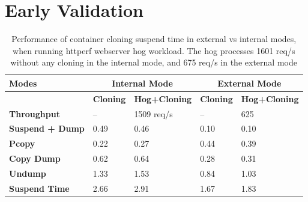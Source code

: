 \section{Early Validation}
\label{sec:evaluation}




\begin{table}[ht]
  \centering
    \begin{tabular}{ | p{1.8cm} | l | l | l | l |}
    \hline
    \textbf{Modes} & \multicolumn{2}{|c|}{\textbf{Internal Mode}} & \multicolumn{2}{|c|}{\textbf{External Mode}}\\\hline
    \textbf{ } & \textbf{Cloning} & \textbf{Hog+Cloning} & \textbf{Cloning} & \textbf{Hog+Cloning} \\ \hline
    \hline
    \textbf{Throughput} & --  & 1509 req/s & --  & 625\\ \hline
    \hline
    \textbf{Suspend + Dump} & 0.49 & 0.46 & 0.10  & 0.10\\ \hline
    \textbf{Pcopy } & 0.22  & 0.27 & 0.44  & 0.39\\ \hline
    \textbf{Copy Dump } & 0.62  & 0.64 & 0.28  & 0.31 \\ \hline
    \textbf{Undump} & 1.33  & 1.53 & 0.84 & 1.03 \\ \hline 
    \hline
    \textbf{Suspend Time} & 2.66 & 2.91 & 1.67 & 1.83 \\ \hline
    \end{tabular}
    \caption{Performance of container cloning suspend time in external vs internal modes, when running httperf webserver hog workload.
      The hog processes 1601 req/s without any cloning in the internal mode, and 675 req/s in the external mode}
\label{table:clonePerf}
\end{table}

